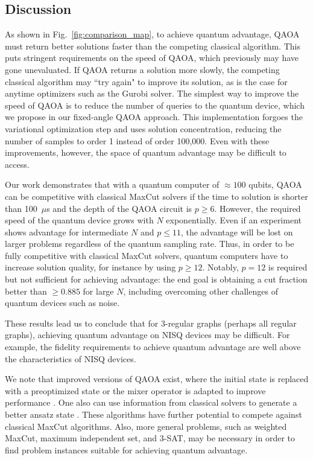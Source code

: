 \subsection{Discussion}

As shown in Fig.~\ref{fig:comparison_map}, to achieve quantum advantage, QAOA must return better solutions faster than the competing classical algorithm. This puts stringent requirements on the speed of QAOA, which previously may have gone unevaluated. If QAOA returns a solution more slowly, the competing classical algorithm may ``try again" to improve its solution, as is the case for anytime optimizers such as the Gurobi solver. The simplest way to improve the speed of QAOA is to reduce the number of queries to the quantum device, which we propose in our fixed-angle QAOA approach. This implementation forgoes the variational optimization step and uses solution concentration, reducing the number of samples to order 1 instead of order 100,000. Even with these improvements, however, the space of quantum advantage may be difficult to access.

Our work demonstrates that with a quantum computer of $\approx 100$ qubits, QAOA can be competitive with classical MaxCut solvers if the time to solution is shorter than 100~$\mu$s and the depth of the QAOA circuit is $p\geq6$.
However, the required speed of the quantum device grows with $N$ exponentially. Even if an experiment shows advantage for intermediate $N$ and $p\leq11$, the advantage will be lost on larger problems regardless of the quantum sampling rate. 
Thus, in  order  to be fully competitive with classical MaxCut solvers, quantum computers have to increase solution quality, for instance by using $p\geq12$.
Notably, $p=12$ is required but not sufficient for achieving advantage: the end goal is obtaining a cut fraction better than $\geq 0.885$ for large $N$, including overcoming other challenges of quantum devices such as noise.

These results lead us to  conclude that for 3-regular graphs (perhaps all regular graphs),  achieving quantum advantage on NISQ devices may be difficult. For example, the fidelity requirements to achieve quantum advantage are well above the characteristics of NISQ devices.



We note that  improved versions of QAOA exist, where the initial state is replaced with a preoptimized state \cite{warmstartQAOA} or the mixer operator is adapted to improve performance \cite{zhu2020adaptive, Govia2021}. One also can use information from classical solvers to generate a better ansatz state \cite{wurtz2021classically}. These algorithms have further potential to compete against classical MaxCut algorithms.
Also, more general problems, such as weighted MaxCut, maximum independent set, and 3-SAT, may be necessary in order to find problem instances suitable for achieving quantum advantage.

